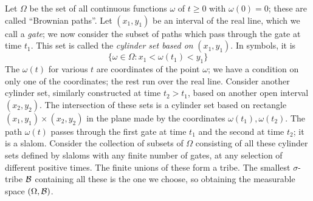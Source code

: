 Let $\Omega$ be the set of all continuous functions $\omega$ of $t\geq 0$
with $\omega(0)=0$;
these are called ``Brownian paths''. Let $(x_1,y_1)$ be an interval of the
real line, which we call a {\em gate}; we now
consider the subset of paths which pass through the gate at time $t_1$. This set is called
the {\em cylinder set based on} $(x_1,y_1)$.
In symbols, it is
\[\{\omega\in\Omega:x_1<\omega(t_1)<y_1\}\]
The $\omega(t)$ for various $t$ are
coordinates of the point $\omega$; we have a condition
on only one of the coordinates; the rest run over the real line. Consider
another cylinder set, similarly constructed at time $t_2>t_1$, based on
another open interval $(x_2,y_2)$. The intersection of these sets is a
cylinder set based on rectangle $(x_1,y_1)\times(x_2,y_2)$ in the plane
made by the coordinates $\omega(t_1),\omega(t_2)$. The path $\omega(t)$
passes through the first gate at time $t_1$ and the
second at time $t_2$; it is a slalom. Consider the collection of subsets
of $\Omega$ consisting of all these cylinder sets defined by slaloms with
any finite number of gates, at any selection of different positive times.
The finite unions of these form a tribe. The smallest $\sigma$-tribe
${\cal B}$ containing all these is the one we choose, so obtaining
the measurable space $(\Omega,{\cal B})$.


